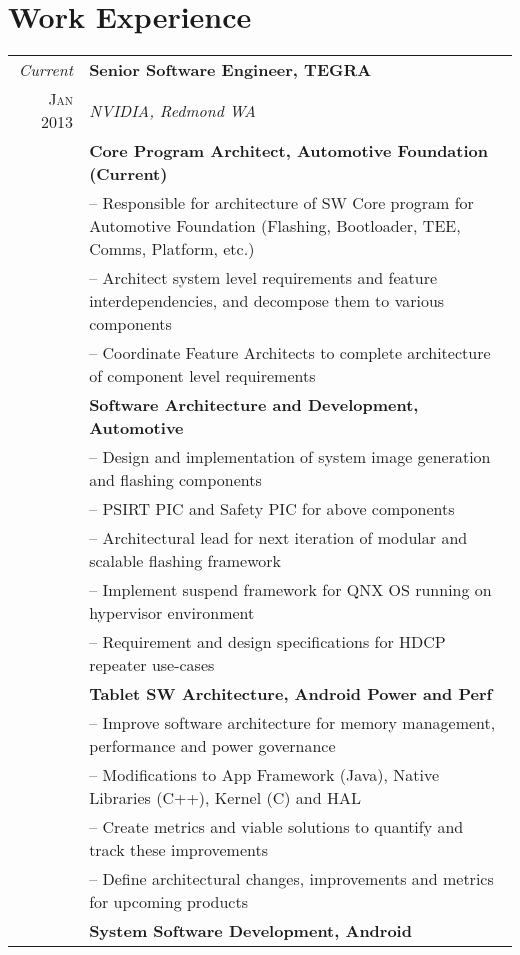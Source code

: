 \documentclass[letter,10pt]{article}
\begin{document}
\section{Work Experience}
\begin{tabular}{r|p{16cm}}

\emph{Current} & \textbf{Senior Software Engineer, TEGRA}\\
\textsc{Jan 2013}&\emph{NVIDIA, Redmond WA}\\
&\footnotesize{\textbf{Core Program Architect, Automotive Foundation (Current)
}}\\
&\footnotesize{
-- Responsible for architecture of SW Core program for Automotive Foundation (Flashing, Bootloader, TEE, Comms, Platform, etc.)
}\\
&\footnotesize{
-- Architect system level requirements and feature interdependencies, and decompose them to various components
}\\
&\footnotesize{
-- Coordinate Feature Architects to complete architecture of component level requirements
}\\
&\footnotesize{\textbf{Software Architecture and Development, Automotive
}}\\
&\footnotesize{
-- Design and implementation of system image generation and flashing components
}\\
&\footnotesize{
-- PSIRT PIC and Safety PIC for above components
}\\
&\footnotesize{
-- Architectural lead for next iteration of modular and scalable flashing framework
}\\
&\footnotesize{
-- Implement suspend framework for QNX OS running on hypervisor environment
}\\
&\footnotesize{
-- Requirement and design specifications for HDCP repeater use-cases
}\\
&\footnotesize{\textbf{Tablet SW Architecture, Android Power and Perf
}}\\
&\footnotesize{
 -- Improve software architecture for memory management, performance and power governance
}\\
&\footnotesize{
 -- Modifications to App Framework (Java), Native Libraries (C++), Kernel (C) and HAL 
}\\
&\footnotesize{
 -- Create metrics and viable solutions to quantify and track these improvements
}\\
&\footnotesize{
-- Define architectural changes, improvements and metrics for upcoming products
}\\
&\footnotesize{\textbf{System Software Development, Android
}}
\end{tabular}
\end{document}
